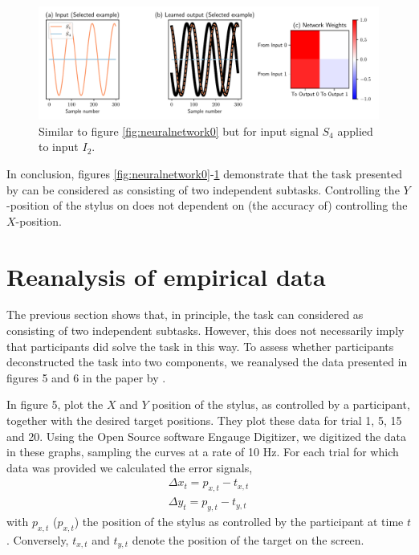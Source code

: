 \documentclass[11pt]{article}
\begin{document}
\begin{figure}
  	\centering
  	\includegraphics[width=1\linewidth]{neural_network_2}
  	\caption{Similar to figure \ref{fig:neuralnetwork0} but for input signal $S_4$ applied to input $I_2$.}
  	\label{fig:neuralnetwork2}
\end{figure} 

In conclusion, figures \ref{fig:neuralnetwork0}-\ref{fig:neuralnetwork2} demonstrate that the task presented by \citet{Annand2020} can be considered as consisting of two independent subtasks. Controlling the $Y$-position of the stylus on does not dependent on (the accuracy of) controlling the $X$-position. 

\section{Reanalysis of empirical data}

The previous section shows that, in principle, the task can considered as consisting of two independent subtasks. However, this does not necessarily imply that participants did solve the task in this way. To assess whether participants deconstructed the task into two components, we reanalysed the data presented in figures 5 and 6 in the paper by \citet{Annand2020}.

In figure 5, \citet{Annand2020} plot the $X$ and $Y$ position of the stylus, as controlled by a participant, together with the desired target positions. They plot these data for trial 1, 5, 15 and 20. Using the Open Source software Engauge Digitizer, we digitized the data in these graphs, sampling the curves at a rate of 10 Hz. For each trial for which data was provided we calculated the error signals,
%
\begin{eqnarray}
\Delta x_t = p_{x,t} - t_{x,t}\\
\Delta y_t = p_{y,t} - t_{y,t}
\end{eqnarray}
%
with $p_{x,t}$ ($p_{x,t}$) the position of the stylus as controlled by the participant at time $t$. Conversely, $t_{x,t}$ and $ t_{y,t}$ denote the position of the target on the screen.
\end{document}
